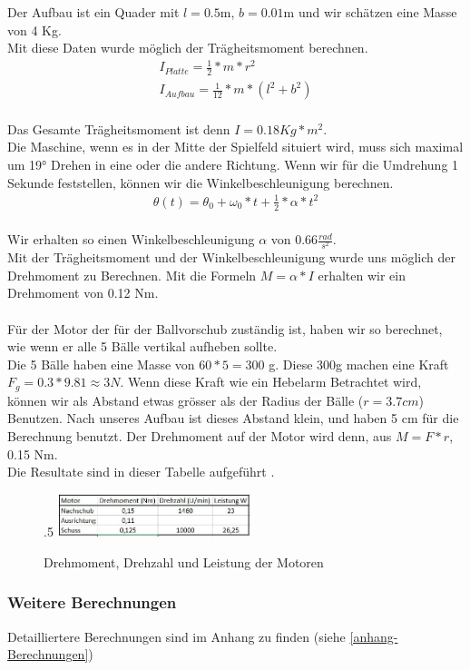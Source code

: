 Der Aufbau ist ein Quader mit $l=0.5$m, $b=0.01$m und wir schätzen eine Masse von 4 Kg.\\
Mit diese Daten wurde möglich der Trägheitsmoment berechnen.\\
\begin{gather}
	I_{Platte}=\frac{1}{2}*m*r^2 \\
	I_{Aufbau}=\frac{1}{12}*m*(l^2+b^2)
\end{gather}\\
Das Gesamte Trägheitsmoment ist denn $I=0.18 Kg*m^2$.\\
Die Maschine, wenn es in der Mitte der Spielfeld situiert wird, muss sich maximal um 19° Drehen in eine oder die andere Richtung. Wenn wir für die Umdrehung 1 Sekunde feststellen, können wir die Winkelbeschleunigung berechnen. \\
\begin{gather}
	\theta(t)=\theta_0+\omega_0*t+\frac{1}{2}*\alpha*t^2
\end{gather}\\
Wir erhalten so einen Winkelbeschleunigung $\alpha$ von 0.66$\frac{rad}{s^2}$.\\
Mit der Trägheitsmoment und der Winkelbeschleunigung wurde uns möglich der Drehmoment zu Berechnen.
Mit die Formeln $M=\alpha*I$ erhalten wir ein Drehmoment von 0.12 Nm.\\ \\
Für der Motor der für der Ballvorschub zuständig ist, haben wir so berechnet, wie wenn er alle 5 Bälle vertikal aufheben sollte.\\
Die 5 Bälle haben eine Masse von $60*5=300$ g. Diese 300g machen eine Kraft $F_g=0.3*9.81\approx3 N$. Wenn diese Kraft wie ein Hebelarm Betrachtet wird, können wir als Abstand etwas grösser als der Radius der Bälle ($r=3.7cm$) Benutzen. Nach unseres Aufbau ist dieses Abstand klein, und haben 5 cm für die Berechnung benutzt. Der Drehmoment auf der Motor wird denn, aus $M=F*r$, 0.15 Nm.\\
Die Resultate sind in dieser Tabelle aufgeführt .\\
\begin{figure}{.5\textwidth}
	\includegraphics[width=0.5\textwidth]{../../fig/Tabelle_Drehmomente.jpg}
	\caption{Drehmoment, Drehzahl und Leistung der Motoren}
	\label{fig:Drehmoment}
\end{figure} 
\newpage


\subsubsection{Weitere Berechnungen}
Detailliertere Berechnungen sind im Anhang zu finden (siehe \ref{anhang-Berechnungen})